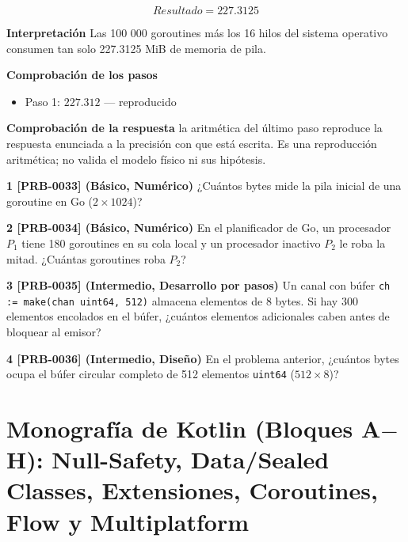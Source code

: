 \documentclass{book}
\begin{document}
\begin{tcolorbox}[title={Problema resuelto}, studiumworked, breakable]
\[
Resultado = 227.3125
\]

\noindent\textbf{Interpretación}
Las 100 000 goroutines más los 16 hilos del sistema operativo consumen tan solo 227.3125 MiB de memoria de pila.

\noindent\textbf{Comprobación de los pasos}
\begin{itemize}
\item Paso 1: $227.312$ — reproducido
\end{itemize}

\noindent\textbf{Comprobación de la respuesta} la aritmética del último paso reproduce la respuesta enunciada a la precisión con que está escrita. Es una reproducción aritmética; no valida el modelo físico ni sus hipótesis.
\end{tcolorbox}

\begin{tcolorbox}[title={Ejercicios}, studiumworked, breakable]

\noindent\textbf{1 [PRB-0033] (Básico, Numérico)}
¿Cuántos bytes mide la pila inicial de una goroutine en Go (\(2 \times 1024\))?

\noindent\textbf{2 [PRB-0034] (Básico, Numérico)}
En el planificador de Go, un procesador \(P_1\) tiene 180 goroutines en su cola local y un procesador inactivo \(P_2\) le roba la mitad. ¿Cuántas goroutines roba \(P_2\)?

\noindent\textbf{3 [PRB-0035] (Intermedio, Desarrollo por pasos)}
Un canal con búfer \texttt{ch := make(chan uint64, 512)} almacena elementos de 8 bytes. Si hay 300 elementos encolados en el búfer, ¿cuántos elementos adicionales caben antes de bloquear al emisor?

\noindent\textbf{4 [PRB-0036] (Intermedio, Diseño)}
En el problema anterior, ¿cuántos bytes ocupa el búfer circular completo de 512 elementos \texttt{uint64} (\(512 \times 8\))?
\end{tcolorbox}

\chapter{Monografía de Kotlin (Bloques A\(-\)H): Null-Safety, Data/Sealed Classes, Extensiones, Coroutines, Flow y Multiplatform}
\label{chap:cap07-monografia-kotlin-null-safety-coroutines-flow-kmp}
\end{document}
